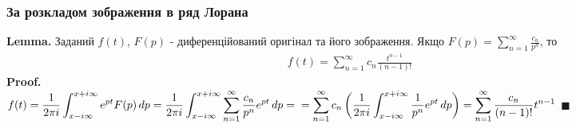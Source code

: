 \documentclass[a4paper, 14pt]{extarticle}
\begin{document}
\subsubsection{За розкладом зображення в ряд Лорана}
\textbf{Lemma.} Заданий $f(t)$, $F(p)$ - диференційований оригінал та його зображення. Якщо $\displaystyle F(p) = \sum_{n=1}^{\infty} \frac{c_n}{p^n}$, то
\begin{align*}
f(t) = \sum_{n=1}^{\infty} c_n \frac{t^{n-1}}{(n-1)!}
\end{align*}
\textbf{Proof.}\\
$\displaystyle f(t) = \frac{1}{2 \pi i} \int_{x - i\infty}^{x + i\infty} e^{pt}F(p)\,dp  = \frac{1}{2 \pi i} \int_{x - i\infty}^{x + i\infty} \sum_{n=1}^{\infty} \frac{c_n}{p^n} e^{pt}\,dp = \\ = \sum_{n=1}^{\infty} c_n \left( \frac{1}{2\pi i} \int_{x - i\infty}^{x + i\infty} \frac{1}{p^n} e^{pt}\,dp \right) = \sum_{n=1}^{\infty} \frac{c_n}{(n-1)!}t^{n-1}$ $\blacksquare$\\
\end{document}
